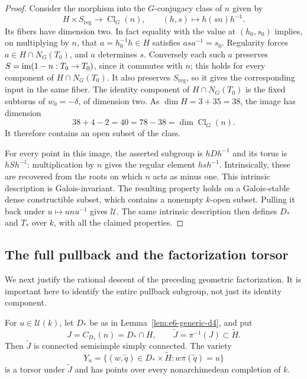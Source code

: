 \begin{proof}
Consider the morphism into the $G$-conjugacy class of $n$ given by
\[
 H\times S_{\mathrm{reg}}\longrightarrow \operatorname{Cl}_G(n),
 \qquad (h,s)\longmapsto h(sn)h^{-1}.
\]
Its fibers have dimension two.  In fact equality with the value at
$(h_0,s_0)$ implies, on multiplying by $n$, that
$a=h_0^{-1}h\in H$ satisfies $asa^{-1}=s_0$.  Regularity forces
$a\in H\cap N_G(T_0)$, and $a$ determines $s$.  Conversely each such
$a$ preserves $S=\operatorname{im}(1-n:T_0\to T_0)$, since it commutes with $n$;
this holds for every component of $H\cap N_G(T_0)$.  It also preserves
$S_{\mathrm{reg}}$, so it gives the corresponding input in the same
fiber.  The identity
component of $H\cap N_G(T_0)$ is the fixed subtorus of $w_0=-\delta$,
of dimension two.  As $\dim H=3+35=38$, the image has dimension
\[
 38+4-2=40=78-38=\dim\operatorname{Cl}_G(n).
\]
It therefore contains an open subset of the class.

For every point in this image, the asserted subgroup is $hDh^{-1}$ and
its torus is $hSh^{-1}$: multiplication by $n$ gives the regular element
$hsh^{-1}$.  Intrinsically, these are recovered from the roots on which
$n$ acts as minus one.  This intrinsic description is Galois-invariant.
The resulting property holds on a Galois-stable dense constructible
subset, which contains a nonempty $k$-open subset.  Pulling it back under
$u\mapsto unu^{-1}$ gives $\mathcal U$.  The same intrinsic description
then defines $D_*$ and $T_*$ over $k$, with all the claimed properties.
\end{proof}

\subsection{The full pullback and the factorization torsor}

We next justify the rational descent of the preceding geometric
factorization.  It is important here to identify the entire pullback
subgroup, not just its identity component.

\begin{lemma}\label{lem:e6-pullback}
For $u\in\mathcal U(k)$, let $D_*$ be as in
Lemma~\ref{lem:e6-generic-d4}, and put
\[
 J=C_{D_*}(n)=D_*\cap H,
 \qquad \widetilde J=\pi^{-1}(J)\subset\widetilde H.
\]
Then $\widetilde J$ is connected semisimple simply connected.  The
variety
\begin{equation}\label{eq:e6-factorization-torsor}
 Y_u=\{(w,\widetilde q)\in D_*\times\widetilde H:
                    w\pi(\widetilde q)=u\}
\end{equation}
is a torsor under $\widetilde J$ and has points over every
nonarchimedean completion of $k$.
\end{lemma}

